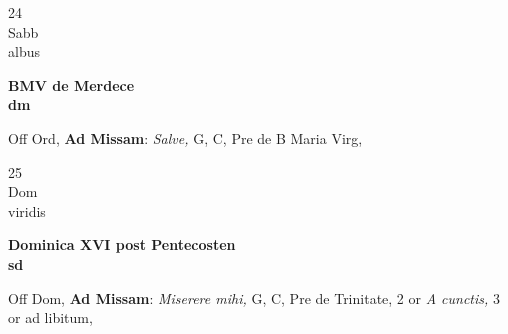 \documentclass[10pt, openany]{book}
\begin{document}
        \begin{center}
            \begin{minipage}{3.5in}
                \vspace{2em}
                \begin{minipage}{0.5in}
                    {\Huge 24} \\
                    {\normalsize Sabb} \\
                    {\normalsize albus}
                \end{minipage}
                \begin{minipage}{3.0in}
                    \textbf{ \large BMV de Merdece \\
                    \textnormal{\normalsize dm}} \\ 
                \end{minipage}
                \begin{justify}Off Ord, \textbf{Ad Missam}: \textit{Salve,} G, C, Pre de B Maria Virg,  
                \end{justify}
            \end{minipage}
        \end{center}
    
        \begin{center}
            \begin{minipage}{3.5in}
                \vspace{2em}
                \begin{minipage}{0.5in}
                    {\Huge 25} \\
                    {\normalsize Dom} \\
                    {\normalsize viridis}
                \end{minipage}
                \begin{minipage}{3.0in}
                    \textbf{ \large Dominica XVI post Pentecosten \\
                    \textnormal{\normalsize sd}} \\ 
                \end{minipage}
                \begin{justify}Off Dom, \textbf{Ad Missam}: \textit{Miserere mihi,} G, C, Pre de Trinitate, 2 or \textit{A cunctis,} 3 or ad libitum,  
                \end{justify}
            \end{minipage}
        \end{center}
    
\end{document}
